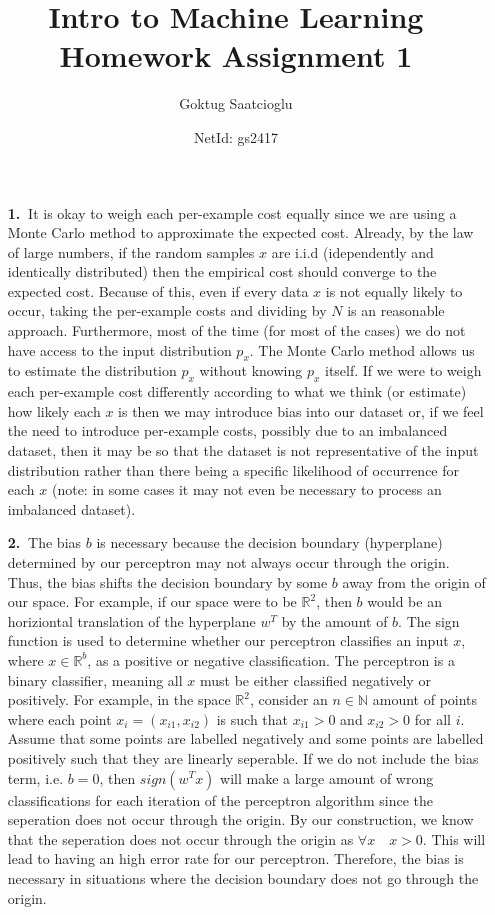 \documentclass [10pt]{article}
\begin{document}
\title{Intro to Machine Learning Homework Assignment 1}
\author{Goktug Saatcioglu}
\date{NetId: gs2417}
\maketitle
\begin{enumerate}
	\item[\textbf{1.$\>$}]It is okay to weigh each per-example cost equally since we are using a Monte Carlo method to approximate the expected cost. Already, by the law of large numbers, if the random samples $x$ are i.i.d (idependently and identically distributed) then the empirical cost should converge to the expected cost. Because of this, even if every data $x$ is not equally likely to occur, taking the per-example costs and dividing by $N$ is an reasonable approach. Furthermore, most of the time (for most of the cases) we do not have access to the input distribution $p_{x}$. The Monte Carlo method allows us to estimate the distribution $p_{x}$ without knowing $p_{x}$ itself. If we were to weigh each per-example cost differently according to what we think (or estimate) how likely each $x$ is then we may introduce bias into our dataset or, if we feel the need to introduce per-example costs, possibly due to an imbalanced dataset, then it may be so that the dataset is not representative of the input distribution rather than there being a specific likelihood of occurrence for each $x$ (note: in some cases it may not even be necessary to process an imbalanced dataset).
	\item[\textbf{2.$\>$}]The bias $b$ is necessary because the decision boundary (hyperplane) determined by our perceptron may not always occur through the origin. Thus, the bias shifts the decision boundary by some $b$ away from the origin of our space. For example, if our space were to be $\mathbb{R}^{2}$, then $b$ would be an horiziontal translation of the hyperplane $w^{T}$ by the amount of $b$. The sign function is used to determine whether our perceptron classifies an input $x$, where $x \in \mathbb{R}^{b}$, as a positive or negative classification. The perceptron is a binary classifier, meaning all $x$ must be either classified negatively or positively. For example, in the space $\mathbb{R}^{2}$, consider an $n \in \mathbb{N}$ amount of points where each point $x_{i}=(x_{i1},x_{i2})$ is such that $x_{i1} > 0$ and $x_{i2} > 0$ for all $i$. Assume that some points are labelled negatively and some points are labelled positively such that they are linearly seperable. If we do not include the bias term, i.e. $b = 0$, then $sign(w^{T}x)$ will make a large amount of wrong classifications for each iteration of the perceptron algorithm since the seperation does not occur through the origin. By our construction, we know that the seperation does not occur through the origin as $\forall x\quad x > 0$. This will lead to having an high error rate for our perceptron. Therefore, the bias is necessary in situations where the decision boundary does not go through the origin.

\end{enumerate}
\end{document}
